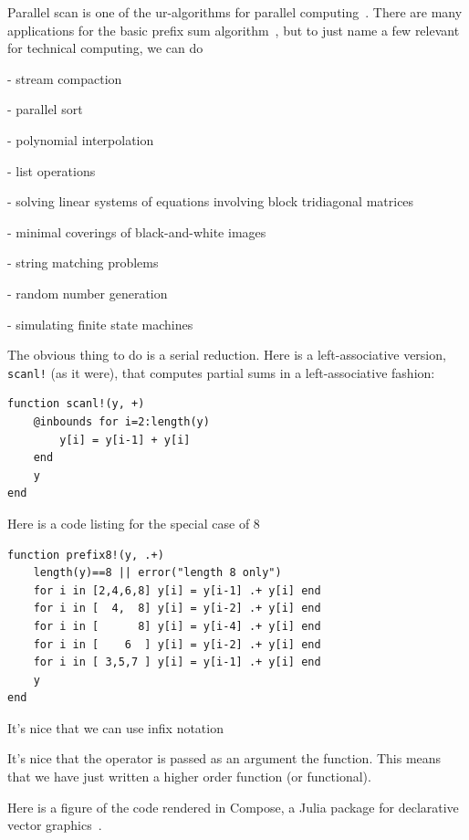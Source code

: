 \documentclass{sig-alternate}
\newcommand{\code}[1]{\texttt{#1}}
\begin{document}
Parallel scan is one of the ur-algorithms for parallel computing~\cite{Kruskal1985,Blelloch1989,Bell2012}.
There are many applications for the basic prefix sum algorithm~\cite{Blelloch1990,Blelloch1993}, but to just name a few relevant for technical computing, we can do 

- stream compaction~\cite{Harris2007}

- parallel sort~\cite{Blelloch1989}

- polynomial interpolation~\cite{Egecioglu1990}

- list operations~\cite{Hillis1986,Gorlatch1999}

- solving linear systems of equations involving block tridiagonal matrices~\cite{Mathias1995}

- minimal coverings of black-and-white images~\cite{Moitra1991}

- string matching problems~\cite{Chi1992}

- random number generation~\cite{Lu1996}

- simulating finite state machines~\cite{Ladner1980}

The obvious thing to do is a serial reduction. Here is a left-associative version, \code{scanl!} (as it were), that computes partial sums in a left-associative fashion:

\begin{verbatim}
function scanl!(y, +)
    @inbounds for i=2:length(y)
        y[i] = y[i-1] + y[i]
    end
    y
end
\end{verbatim}

Here is a code listing for the special case of 8

\begin{verbatim}
function prefix8!(y, .+)
    length(y)==8 || error("length 8 only")
    for i in [2,4,6,8] y[i] = y[i-1] .+ y[i] end
    for i in [  4,  8] y[i] = y[i-2] .+ y[i] end
    for i in [      8] y[i] = y[i-4] .+ y[i] end
    for i in [    6  ] y[i] = y[i-2] .+ y[i] end
    for i in [ 3,5,7 ] y[i] = y[i-1] .+ y[i] end
    y
end
\end{verbatim}

It's nice that we can use infix notation

It's nice that the operator is passed as an argument the function. This means that we have just written a higher order function (or functional).

Here is a figure of the code rendered in Compose, a Julia package for declarative vector graphics~\cite{Compose.jl}. 
\end{document}
